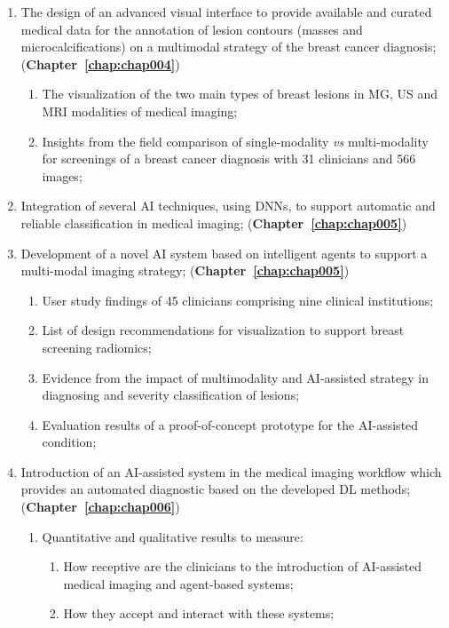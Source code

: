 \begin{enumerate}
\item The design of an advanced visual interface to provide available and curated medical data for the annotation of lesion contours (masses and microcalcifications) on a multimodal strategy of the breast cancer diagnosis; ({\bf Chapter~\ref{chap:chap004}})
\begin{enumerate}[label*=\arabic*.]
\item The visualization of the two main types of breast lesions in \ac{MG}, \ac{US} and \ac{MRI} modalities of medical imaging;
\item Insights from the field comparison of single-modality {\it vs} multi-modality for screenings of a breast cancer diagnosis with 31 clinicians and 566 images;
\end{enumerate}
\item Integration of several \ac{AI} techniques, using \acp{DNN}, to support automatic and reliable classification in medical imaging; ({\bf Chapter~\ref{chap:chap005}})
\item Development of a novel \ac{AI} system based on intelligent agents to support a multi-modal imaging strategy; ({\bf Chapter~\ref{chap:chap005}})
\begin{enumerate}[label*=\arabic*.]
\item User study findings of 45 clinicians comprising nine clinical institutions;
\item List of design recommendations for visualization to support breast screening radiomics;
\item Evidence from the impact of multimodality and \ac{AI}-assisted strategy in diagnosing and severity classification of lesions;
\item Evaluation results of a proof-of-concept prototype for the \ac{AI}-assisted condition;
\end{enumerate}
\item Introduction of an \ac{AI}-assisted system in the medical imaging workflow which provides an automated diagnostic based on the developed \ac{DL} methods; ({\bf Chapter~\ref{chap:chap006}})
\begin{enumerate}[label*=\arabic*.]
\item Quantitative and qualitative results to measure:
\begin{enumerate}[label*=\arabic*.]
\item How receptive are the clinicians to the introduction of \ac{AI}-assisted medical imaging and agent-based systems;
\item How they accept and interact with these systems;

\end{enumerate}
\end{enumerate}
\end{enumerate}
